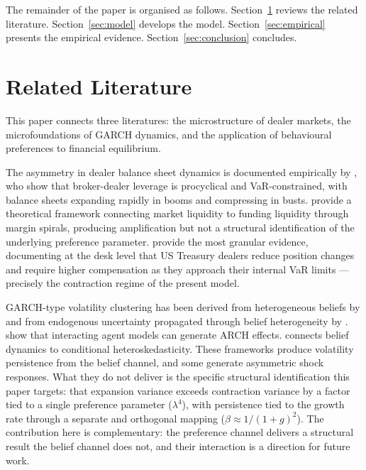 \documentclass[12pt,a4paper]{article}
\theoremstyle{definition}
\begin{document}
The remainder of the paper is organised as follows.
Section~\ref{sec:literature} reviews the related literature.
Section~\ref{sec:model} develops the model.
Section~\ref{sec:empirical} presents the empirical evidence.
Section~\ref{sec:conclusion} concludes.


\section{Related Literature}
\label{sec:literature}

This paper connects three literatures: the microstructure of dealer
markets, the microfoundations of GARCH dynamics, and the application of
behavioural preferences to financial equilibrium.

The asymmetry in dealer balance sheet dynamics is documented empirically
by \citet{adrian2010,adrian2014}, who show that broker-dealer leverage is
procyclical and VaR-constrained, with balance sheets expanding rapidly in
booms and compressing in busts. \citet{brunnermeier2009} provide a
theoretical framework connecting market liquidity to funding liquidity
through margin spirals, producing amplification but not a structural
identification of the underlying preference parameter. \citet{li2025}
provide the most granular evidence, documenting at the desk level that
US Treasury dealers reduce position changes and require higher
compensation as they approach their internal VaR limits --- precisely the
contraction regime of the present model.

GARCH-type volatility clustering has been derived from heterogeneous
beliefs by \citet{brock1998} and from endogenous uncertainty propagated
through belief heterogeneity by \citet{kurz2001}. \citet{follmer2005}
show that interacting agent models can generate ARCH effects.
\citet{watanabe2008} connects belief dynamics to conditional
heteroskedasticity. These frameworks produce volatility persistence from
the belief channel, and some generate asymmetric shock responses.
What they do not deliver is the specific structural identification this
paper targets: that expansion variance exceeds contraction variance by a
factor tied to a single preference parameter ($\lambda^4$), with
persistence tied to the growth rate through a separate and orthogonal
mapping ($\beta \approx 1/(1+g)^2$). The contribution here is
complementary: the preference channel delivers a structural result the
belief channel does not, and their interaction is a direction for future
work.
\end{document}
